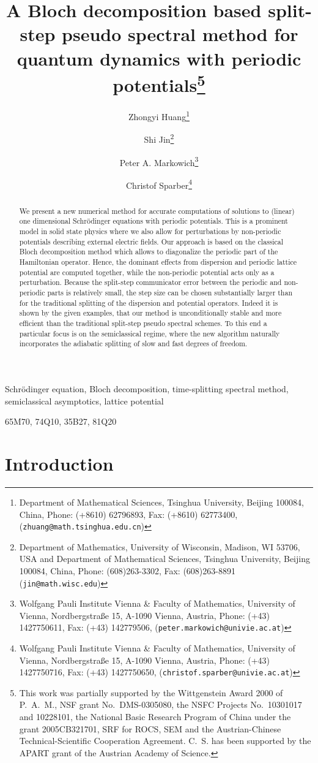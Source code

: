 \documentclass[leqno,final]{siamltex}
\title
{A Bloch decomposition based split-step pseudo spectral method for
quantum dynamics with periodic potentials\thanks{This work was
partially supported by the Wittgenstein Award 2000 of P.~A.~M.,
NSF grant No.~DMS-0305080, the NSFC Projects No.~10301017 and
10228101, the National Basic Research Program of China under the
grant 2005CB321701, SRF for ROCS, SEM and the Austrian-Chinese
Technical-Scientific Cooperation Agreement. C.~S. has been
supported by the APART grant of the Austrian Academy of Science.}}
\author{Zhongyi Huang\thanks{Department of Mathematical Sciences,
Tsinghua University, Beijing 100084,
China, Phone: (+8610) 62796893, Fax: (+8610) 62773400,
({\tt zhuang@math.tsinghua.edu.cn})} \and
Shi Jin\thanks{Department of
Mathematics, University of Wisconsin, Madison, WI 53706, USA and
Department of Mathematical Sciences, Tsinghua University, Beijing
100084, China, Phone: (608)263-3302, Fax: (608)263-8891
({\tt jin@math.wisc.edu})}
\and Peter A.
Markowich\thanks{Wolfgang Pauli Institute Vienna \& Faculty of
Mathematics, University of Vienna, Nordbergstra\ss e 15, A-1090
Vienna, Austria, Phone: (+43) 1427750611, Fax: (+43) 142779506,
({\tt peter.markowich@univie.ac.at})} \and Christof
Sparber\thanks{Wolfgang Pauli Institute Vienna \& Faculty of
Mathematics, University of Vienna, Nordbergstra\ss e 15, A-1090
Vienna, Austria, Phone: (+43) 1427750716, Fax: (+43) 1427750650,
({\tt christof.sparber@univie.ac.at})}
}
\numberwithin{equation}{section}
\newcounter{me}
\begin{document}
\maketitle

\begin{abstract}
We present a new numerical method for accurate computations of
solutions to (linear) one dimensional Schr\"odinger equations with
periodic potentials. This is a prominent model in solid state
physics where we also allow for perturbations by non-periodic
potentials describing external electric fields. Our approach is
based on the classical Bloch decomposition method which allows to
diagonalize the periodic part of the Hamiltonian operator. Hence,
the dominant effects from dispersion and periodic lattice
potential are computed together, while the non-periodic potential
acts only as a perturbation. Because the split-step communicator
error between the periodic and non-periodic parts is relatively
small, the step size can be chosen substantially larger than for
the traditional splitting of the dispersion and potential
operators. Indeed it is shown by the given examples, that our
method is unconditionally stable and more efficient than the
traditional split-step pseudo spectral schemes. To this end a
particular focus is on the semiclassical regime, where the new
algorithm naturally incorporates the adiabatic splitting of slow
and fast degrees of freedom.
\end{abstract}

\begin{keywords}Schr\"odinger equation, Bloch decomposition,
time-splitting spectral method,
semiclassical asymptotics, lattice potential\end{keywords}

\begin{AMS}65M70, 74Q10, 35B27, 81Q20\end{AMS}

\pagestyle{myheadings} \thispagestyle{plain} 

\section{Introduction}\label{sec:intro}
\end{document}
